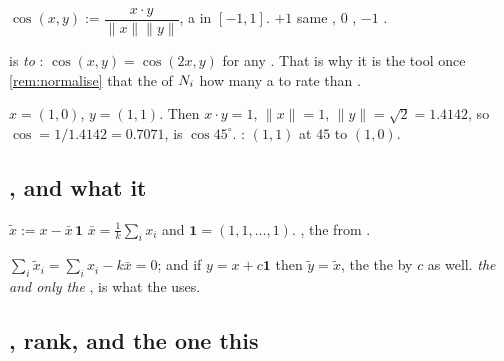 \begin{definition}
$\cos(x,y) := \dfrac{x\cdot y}{\|x\|\|y\|}$, a  in $[-1,1]$.
$+1$  same , $0$ , $-1$ .
\end{definition}

\begin{remark}
  is \emph{ to }: $\cos(x,y)=\cos(2x,y)$ for any
. That is  why it is the  tool once \cref{rem:normalise}
 that the  of $N_i$  how many  a 
 to rate  than  .
\end{remark}

 $x=(1,0)$, $y=(1,1)$. Then $x\cdot y = 1$,
$\|x\|=1$, $\|y\|=\sqrt2=1.4142$, so $\cos = 1/1.4142 = 0.7071$,  is
$\cos 45^\circ$. : $(1,1)$  at $45$  to $(1,0)$.

\subsection{, and what it }

\begin{definition}
$\tilde x := x - \bar x\,\mathbf{1}$  $\bar x = \tfrac1k\sum_i x_i$ and
$\mathbf{1}=(1,1,\dots,1)$. ,  the  from  .
\end{definition}

 $\sum_i \tilde x_i = \sum_i x_i - k\bar x = 0$;
and if $y = x + c\mathbf{1}$ then $\tilde y = \tilde x$,  the  
the  by  $c$ as well. \emph{  the   and
 only the },  is  what the  uses.

\subsection{, rank, and the one  this  }

